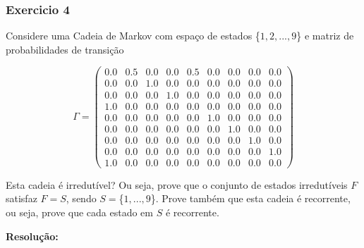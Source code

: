 \documentclass[
]{article}
\begin{document}
\pagebreak

\hypertarget{exercicio-4}{%
\subsubsection{Exercicio 4}\label{exercicio-4}}

Considere uma Cadeia de Markov com espaço de estados \{\(1,2,...,9\)\} e
matriz de probabilidades de transição

\[\Gamma = \begin{pmatrix}
0.0 & 0.5 & 0.0 & 0.0 & 0.5 & 0.0 & 0.0 & 0.0 & 0.0 \\
0.0 & 0.0 & 1.0 & 0.0 & 0.0 & 0.0 & 0.0 & 0.0 & 0.0 \\
0.0 & 0.0 & 0.0 & 1.0 & 0.0 & 0.0 & 0.0 & 0.0 & 0.0 \\
1.0 & 0.0 & 0.0 & 0.0 & 0.0 & 0.0 & 0.0 & 0.0 & 0.0 \\
0.0 & 0.0 & 0.0 & 0.0 & 0.0 & 1.0 & 0.0 & 0.0 & 0.0 \\
0.0 & 0.0 & 0.0 & 0.0 & 0.0 & 0.0 & 1.0 & 0.0 & 0.0 \\
0.0 & 0.0 & 0.0 & 0.0 & 0.0 & 0.0 & 0.0 & 1.0 & 0.0 \\
0.0 & 0.0 & 0.0 & 0.0 & 0.0 & 0.0 & 0.0 & 0.0 & 1.0 \\
1.0 & 0.0 & 0.0 & 0.0 & 0.0 & 0.0 & 0.0 & 0.0 & 0.0
\end{pmatrix}\]

Esta cadeia é irredutível? Ou seja, prove que o conjunto de estados
irredutíveis \(F\) satisfaz \(F=S\), sendo \(S=\)\{\(1,...,9\)\}. Prove
também que esta cadeia é recorrente, ou seja, prove que cada estado em
\(S\) é recorrente.

\textbf{Resolução:}
\end{document}
